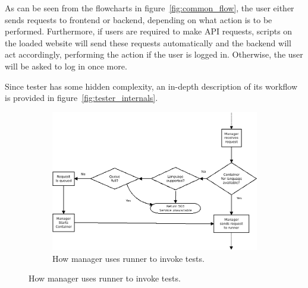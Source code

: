 As can be seen from the flowcharts in figure~\ref{fig:common_flow}, the user either sends requests to frontend or backend, depending on what action is to be performed. Furthermore, if users are required to make API requests, scripts on the loaded website will send these requests automatically and the backend will act accordingly, performing the action if the user is logged in. Otherwise, the user will be asked to log in once more.

Since tester has some hidden complexity, an in-depth description of its workflow is provided in figure~\ref{fig:tester_internals}.
\begin{figure}
    \centering

    \begin{subfigure}{\linewidth}
    \centering
    \includegraphics[width=.9\linewidth]{img/manager_usage.png}
    \caption{How manager uses runner to invoke tests.}
    \end{subfigure}
    

\end{figure}

